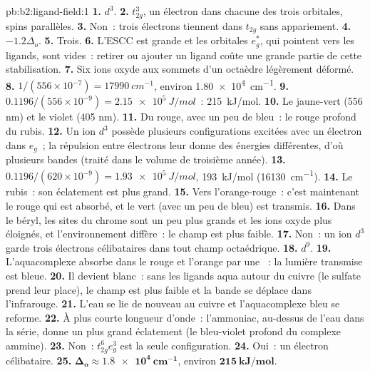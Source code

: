 \begin{solution}{pb:b2:ligand-field:1}
\textbf{1.} $d^3$.
\textbf{2.} $t_{2g}^3$, un électron dans chacune des trois orbitales, spins parallèles.
\textbf{3.} Non~: trois électrons tiennent dans $t_{2g}$ sans appariement.
\textbf{4.} $-1.2\Delta_o$.
\textbf{5.} Trois.
\textbf{6.} L'ESCC est grande et les orbitales $e_g^*$, qui pointent vers les ligands, sont
vides~: retirer ou ajouter un ligand coûte une grande partie de cette stabilisation.
\textbf{7.} Six ions oxyde aux sommets d'un octaèdre légèrement déformé.
\textbf{8.} $1/(556 \times 10^{-7}) = \qty{17990}{cm^{-1}}$, environ \qty{1.80e4}{cm^{-1}}.
\textbf{9.} $0.1196/(556 \times 10^{-9}) = \qty{2.15e5}{J/mol}$~: \qty{215}{kJ/mol}.
\textbf{10.} Le jaune-vert (556 nm) et le violet (405 nm).
\textbf{11.} Du rouge, avec un peu de bleu~: le rouge profond du rubis.
\textbf{12.} Un ion $d^3$ possède plusieurs configurations excitées avec un électron dans $e_g$~;
la répulsion entre électrons leur donne des énergies différentes, d'où plusieurs bandes (traité dans le
volume de troisième année).
\textbf{13.} $0.1196/(620 \times 10^{-9}) = \qty{1.93e5}{J/mol}$, \qty{193}{kJ/mol}
(\qty{16130}{cm^{-1}}).
\textbf{14.} Le rubis~: son éclatement est plus grand.
\textbf{15.} Vers l'orange-rouge~: c'est maintenant le rouge qui est absorbé, et le vert (avec un peu de bleu) est transmis.
\textbf{16.} Dans le béryl, les sites du chrome sont un peu plus grands et les ions oxyde plus éloignés,
et l'environnement diffère~: le champ est plus faible.
\textbf{17.} Non~: un ion $d^3$ garde trois électrons célibataires dans tout champ octaédrique.
\textbf{18.} $d^9$.
\textbf{19.} L'aquacomplexe absorbe dans le rouge et l'orange par une ~: la
lumière transmise est bleue.
\textbf{20.} Il devient blanc~: sans les ligands aqua autour du cuivre (le sulfate prend leur
place), le champ est plus faible et la bande se déplace dans l'infrarouge.
\textbf{21.} L'eau se lie de nouveau au cuivre et l'aquacomplexe bleu se reforme.
\textbf{22.} À plus courte longueur d'onde~: l'ammoniac, au-dessus de l'eau dans la série, donne un plus grand
éclatement (le bleu-violet profond du complexe ammine).
\textbf{23.} Non~: $t_{2g}^6e_g^3$ est la seule configuration.
\textbf{24.} Oui~: un électron célibataire.
\textbf{25.} $\boldsymbol{\Delta_o \approx \qty{1.8e4}{cm^{-1}}}$, environ
$\boldsymbol{\qty{215}{kJ/mol}}$.
\end{solution}
